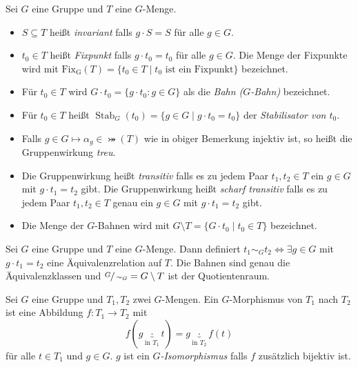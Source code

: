 \begin{definition}
	Sei $G$ eine Gruppe und $T$ eine $G$-Menge.
	\begin{itemize}
		\item $S \subseteq T$ heißt \emph{invariant} falls $g \cdot S = S$ für alle $g \in G$.
		\item $t_0 \in T$ heißt \emph{Fixpunkt} falls $g \cdot t_0 = t_0$ für alle $g \in G$.
			Die Menge der Fixpunkte wird mit $\operatorname{Fix_{G}}(T) = \{t_0 \in T \mid t_0 \text{ ist ein Fixpunkt}\} $ bezeichnet.
		\item Für $t_0 \in T$ wird $G \cdot t_0 = \{g \cdot t_0 : g \in G\}$ als die \emph{Bahn ($G$-Bahn)} bezeichnet.
		\item Für $t_0 \in T$ heißt $\operatorname{Stab}_{G}(t_0) = \{g \in G \mid g \cdot t_0 = t_0\}$ der \emph{Stabilisator von $t_0$}.
		\item Falls $g \in G \mapsto \alpha_{g} \in \bij(T)$ wie in obiger Bemerkung injektiv ist, so heißt die Gruppenwirkung \emph{treu}.
		\item Die Gruppenwirkung heißt \emph{transitiv} falls es zu jedem Paar $t_1,t_2 \in T$ ein $g \in G$ mit $g \cdot  t_1 = t_2$ gibt.
			Die Gruppenwirkung heißt \emph{scharf transitiv} falls es zu jedem Paar $t_1,t_2 \in T$ genau ein $g \in G$ mit $g \cdot t_1 = t_2$ gibt.
		\item Die Menge der $G$-Bahnen wird mit $G \setminus T = \{G \cdot t_0 \mid t_0 \in T\} $ bezeichnet.
	\end{itemize}
\end{definition}


\begin{lemma}
	Sei $G$ eine Gruppe und $T$ eine $G$-Menge.
	Dann definiert $t_1 \sim_{G} t_2 \Leftrightarrow \exists g \in G$ mit $g \cdot t_1 = t_2$ eine Äquivalenzrelation auf $T$. Die Bahnen sind genau die Äquivalenzklassen
	und $\sfrac{G}{\sim_{G}} = G \setminus T$ ist der Quotientenraum.
\end{lemma}


\begin{definition}
	Sei $G$ eine Gruppe und $T_1, T_2$ zwei $G$-Mengen.
	Ein $G$-Morphismus von $T_1$ nach $T_2$ ist eine Abbildung $f: T_1 \to T_2$ mit
	\[
		f(g \underbrace{\cdot }_{\text{in } T_1} t) = g \underbrace{\cdot}_{\text{in } T_2} f(t)
	\]
	für alle $t \in T_1$ und $g \in G$.
	$g$ ist ein \emph{$G$-Isomorphismus} falls $f$ zusätzlich bijektiv ist.
\end{definition}

